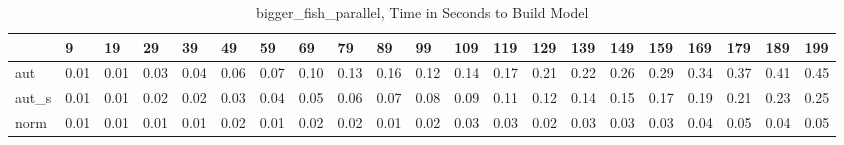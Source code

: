 \begin{table}
\caption{bigger_fish_parallel, Time in Seconds to Build Model}
\label{bigger_fish_parallel_model_time}
\begin{tabular}{lllllllllllllllllllll}
\toprule
 & 9 & 19 & 29 & 39 & 49 & 59 & 69 & 79 & 89 & 99 & 109 & 119 & 129 & 139 & 149 & 159 & 169 & 179 & 189 & 199 \\
\midrule
aut & 0.01 & 0.01 & 0.03 & 0.04 & 0.06 & 0.07 & 0.10 & 0.13 & 0.16 & 0.12 & 0.14 & 0.17 & 0.21 & 0.22 & 0.26 & 0.29 & 0.34 & 0.37 & 0.41 & 0.45 \\
aut_s & 0.01 & 0.01 & 0.02 & 0.02 & 0.03 & 0.04 & 0.05 & 0.06 & 0.07 & 0.08 & 0.09 & 0.11 & 0.12 & 0.14 & 0.15 & 0.17 & 0.19 & 0.21 & 0.23 & 0.25 \\
norm & 0.01 & 0.01 & 0.01 & 0.01 & 0.02 & 0.01 & 0.02 & 0.02 & 0.01 & 0.02 & 0.03 & 0.03 & 0.02 & 0.03 & 0.03 & 0.03 & 0.04 & 0.05 & 0.04 & 0.05 \\
\bottomrule
\end{tabular}
\end{table}
